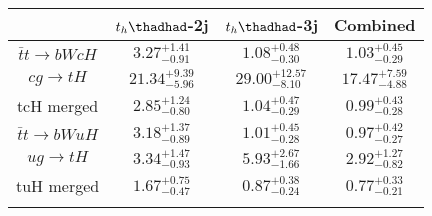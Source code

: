 \centering
\begin{tabular}{cccc} \toprule\toprule
 & $t_h\thadhad$-2j & $t_h\thadhad$-3j & Combined\\\midrule
$\bar{t}t\to bWcH$ & $3.27^{+1.41}_{-0.91}$ & $1.08^{+0.48}_{-0.30}$ & $1.03^{+0.45}_{-0.29}$\\
$cg\to tH$ & $21.34^{+9.39}_{-5.96}$ & $29.00^{+12.57}_{-8.10}$ & $17.47^{+7.59}_{-4.88}$\\
tcH merged & $2.85^{+1.24}_{-0.80}$ & $1.04^{+0.47}_{-0.29}$ & $0.99^{+0.43}_{-0.28}$\\
$\bar{t}t\to bWuH$ & $3.18^{+1.37}_{-0.89}$ & $1.01^{+0.45}_{-0.28}$ & $0.97^{+0.42}_{-0.27}$\\
$ug\to tH$ & $3.34^{+1.47}_{-0.93}$ & $5.93^{+2.67}_{-1.66}$ & $2.92^{+1.27}_{-0.82}$\\
tuH merged & $1.67^{+0.75}_{-0.47}$ & $0.87^{+0.38}_{-0.24}$ & $0.77^{+0.33}_{-0.21}$\\
\bottomrule\bottomrule\\
\end{tabular}